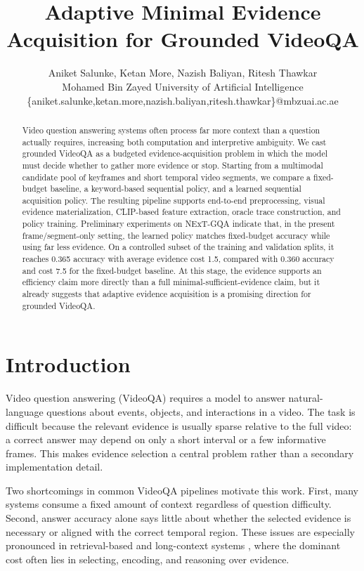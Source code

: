 \documentclass{article}
\title{Adaptive Minimal Evidence Acquisition for Grounded VideoQA}
\author{
  Aniket Salunke, Ketan More, Nazish Baliyan, Ritesh Thawkar \\
  Mohamed Bin Zayed University of Artificial Intelligence \\
  \{aniket.salunke,ketan.more,nazish.baliyan,ritesh.thawkar\}@mbzuai.ac.ae
}
\begin{document}
\maketitle

\begin{abstract}
Video question answering systems often process far more context than a question actually requires, increasing both computation and interpretive ambiguity. We cast grounded VideoQA as a budgeted evidence-acquisition problem in which the model must decide whether to gather more evidence or stop. Starting from a multimodal candidate pool of keyframes and short temporal video segments, we compare a fixed-budget baseline, a keyword-based sequential policy, and a learned sequential acquisition policy. The resulting pipeline supports end-to-end preprocessing, visual evidence materialization, CLIP-based feature extraction, oracle trace construction, and policy training. Preliminary experiments on NExT-GQA indicate that, in the present frame/segment-only setting, the learned policy matches fixed-budget accuracy while using far less evidence. On a controlled subset of the training and validation splits, it reaches 0.365 accuracy with average evidence cost 1.5, compared with 0.360 accuracy and cost 7.5 for the fixed-budget baseline. At this stage, the evidence supports an efficiency claim more directly than a full minimal-sufficient-evidence claim, but it already suggests that adaptive evidence acquisition is a promising direction for grounded VideoQA.
\end{abstract}

\section{Introduction}
Video question answering (VideoQA) requires a model to answer natural-language questions about events, objects, and interactions in a video. The task is difficult because the relevant evidence is usually sparse relative to the full video: a correct answer may depend on only a short interval or a few informative frames. This makes evidence selection a central problem rather than a secondary implementation detail.

Two shortcomings in common VideoQA pipelines motivate this work. First, many systems consume a fixed amount of context regardless of question difficulty. Second, answer accuracy alone says little about whether the selected evidence is necessary or aligned with the correct temporal region. These issues are especially pronounced in retrieval-based and long-context systems \citep{pan2023r2a,luo2024videorag,gia2025vrag,yeo2025universalrag}, where the dominant cost often lies in selecting, encoding, and reasoning over evidence.
\end{document}
